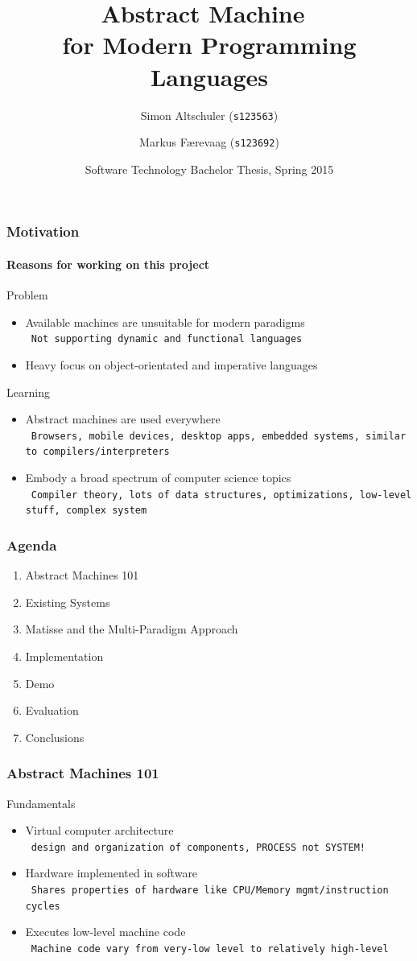 \documentclass{beamer}
\title{Abstract Machine~\\for Modern Programming Languages}
\author[Altschuler, Færevaag]{Simon Altschuler ({\tt s123563}) \and Markus
  Færevaag ({\tt s123692})}
\date{Software Technology Bachelor Thesis, Spring 2015}
\newcommand{\n}[1]{\leavevmode\\~\texttt{\color{red}\tiny #1}}
\begin{document}
\frame{\titlepage}

\begin{frame}
  \frametitle{Motivation}
  \framesubtitle{Reasons for working on this project}

  Problem
  \begin{itemize}
  \item Available machines are unsuitable for modern paradigms
    \n{Not supporting dynamic and functional languages}
  \item Heavy focus on object-orientated and imperative languages
  \end{itemize}

  \pause{}

  \vspace{20pt}
  Learning
  \begin{itemize}
  \item Abstract machines are used everywhere
    \n{Browsers, mobile devices, desktop apps, embedded systems, similar to compilers/interpreters}
  \item Embody a broad spectrum of computer science topics
    \n{Compiler theory, lots of data structures, optimizations, low-level stuff, complex system}
  \end{itemize}

\end{frame}

\begin{frame}
  \frametitle{Agenda}
  \fontsize{11pt}{20}\selectfont
  \begin{enumerate}
  \item Abstract Machines 101
  \item Existing Systems
  \item Matisse and the Multi-Paradigm Approach
  \item Implementation
  \item Demo
  \item Evaluation
  \item Conclusions
  \end{enumerate}
\end{frame}

\begin{frame}
  \frametitle{Abstract Machines 101}

  Fundamentals

  \begin{itemize}[<+->]
  \item Virtual computer architecture
    \n{design and organization of components, PROCESS not SYSTEM!}
  \item Hardware implemented in software
    \n{Shares properties of hardware like CPU/Memory mgmt/instruction cycles}
  \item Executes low-level machine code
    \n{Machine code vary from very-low level to relatively high-level}
  \end{itemize}

\end{frame}
\end{document}
